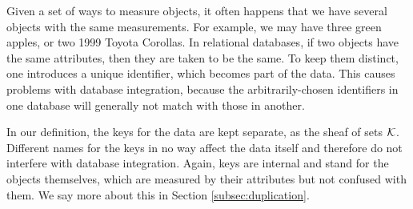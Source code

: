 \documentclass{amsart}
\begin{document}
\begin{remark}\label{rem:internal keys}

Given a set of ways to measure objects, it often happens that we have several objects with the same measurements.  For example, we may have three green apples, or two 1999 Toyota Corollas.  In relational databases, if two objects have the same attributes, then they are taken to be the same.  To keep them distinct, one introduces a unique identifier, which becomes part of the data.  This causes problems with database integration, because the arbitrarily-chosen identifiers in one database will generally not match with those in another.

In our definition, the keys for the data are kept separate, as the sheaf of sets $\mathcal{K}$.  Different names for the keys in no way affect the data itself and therefore do not interfere with database integration.  Again, keys are internal and stand for the objects themselves, which are measured by their attributes but not confused with them.  We say more about this in Section \ref{subsec:duplication}.

\end{remark}
\end{document}
